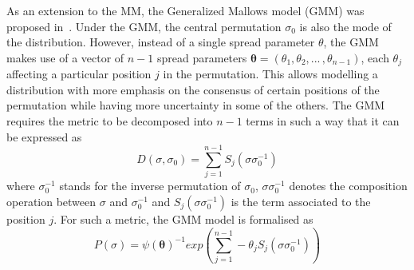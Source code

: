 \documentclass[conference]{IEEEtran}
\begin{document}
As an extension to the MM, the Generalized Mallows model (GMM) was proposed in~\cite{fligner1988}. Under the GMM, the central permutation $\sigma_0$ is also the mode of the distribution. However, instead of a single spread parameter $\theta$, the GMM makes use of a vector of $n-1$ spread parameters $\boldsymbol{\theta}=(\theta_1, \theta_2, ... \, , \theta_{n-1})$, each $\theta_j$ affecting a particular position $j$ in the permutation.  This allows modelling a distribution with more emphasis on the consensus of certain positions of the permutation while having more uncertainty in some of the others. The  GMM  requires the metric to be decomposed into $n-1$ terms in such a way that it can be expressed as 
\begin{equation}
D(\sigma, \sigma_0)=\sum_{j=1}^{n-1}S_j(\sigma\sigma_0^{-1})
\label{eq:decomp}
\end{equation}
where $\sigma_0^{-1}$ stands for the inverse permutation of $\sigma_0$, $\sigma\sigma_0^{-1}$ denotes the composition operation between $\sigma$ and $\sigma_0^{-1}$ and $S_j(\sigma \sigma_0^{-1})$ is the term associated to the position $j$. For such a metric, the GMM model is formalised as
\begin{equation}
P(\sigma)= \psi(\boldsymbol{ \theta})^{-1} exp(\sum_{j=1}^{n-1}-\theta_j S_j(\sigma \sigma_0^{-1}))
\label{eq:gmallows}
\end{equation}
\end{document}
